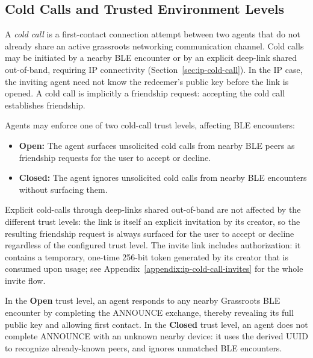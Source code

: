 \subsection{Cold Calls and Trusted Environment Levels}
\label{sec:cold-call-trust}
A \emph{cold call} is a first-contact connection attempt between two agents that do not already share an active grassroots networking communication channel. Cold calls may be initiated by a nearby BLE encounter or by an explicit deep-link shared out-of-band, requiring IP connectivity (Section~\ref{sec:ip-cold-call}).  In the IP case, the inviting agent need not know the redeemer's public key before the link is opened.  A cold call is implicitly a friendship request: accepting the cold call establishes friendship.

Agents may enforce one of two cold-call trust levels, affecting BLE encounters:
\begin{itemize}
\item \textbf{Open:} The agent surfaces unsolicited cold calls from nearby BLE peers as friendship requests for the user to accept or decline.
\item \textbf{Closed:} The agent ignores unsolicited cold calls from nearby BLE encounters without surfacing them.
\end{itemize}
Explicit cold-calls through deep-links shared out-of-band are not affected by the different trust levels: the link is itself an explicit invitation by its creator, so the resulting friendship request is always surfaced for the user to accept or decline regardless of the configured trust level.  The invite link includes authorization: it contains a temporary, one-time 256-bit token generated by its creator that is consumed upon usage; see Appendix~\ref{appendix:ip-cold-call-invites} for the whole invite flow.

In the \textbf{Open} trust level, an agent responds to any nearby Grassroots BLE encounter by completing the ANNOUNCE exchange, thereby revealing its full public key and allowing first contact. In the \textbf{Closed} trust level, an agent does not complete ANNOUNCE with an unknown nearby device: it uses the derived UUID
to recognize already-known peers, and ignores unmatched BLE encounters. 

